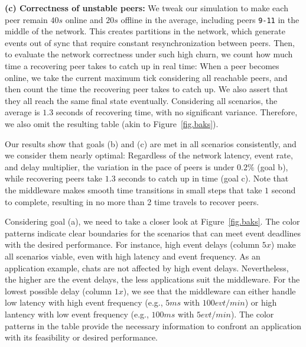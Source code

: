 \documentclass[fleqn,10pt]{SelfArx}
\newcommand{\code}[1]  {\texttt{\footnotesize{#1}}}
\begin{document}
\textbf{(c) Correctness of unstable peers:}
We tweak our simulation to make each peer remain $40s$ online and $20s$
offline in the average, including peers \code{9-11} in the middle of the
network.
This creates partitions in the network, which generate events out of sync that
require constant resynchronization between peers.
%
Then, to evaluate the network correctness under such high churn, we count how
much time a recovering peer takes to catch up in real time:
When a peer becomes online, we take the current maximum tick considering all
reachable peers, and then count the time the recovering peer takes to catch up.
We also assert that they all reach the same final state eventually.
%
Considering all scenarios, the average is $1.3$ seconds of recovering time,
with no significant variance.
Therefore, we also omit the resulting table (akin to Figure~\ref{fig.baks}).

Our results show that goals (b) and (c) are met in all scenarios consistently,
and we consider them nearly optimal:
Regardless of the network latency, event rate, and delay multiplier,
    the variation in the pace of peers is under $0.2\%$ (goal b), while
    recovering peers take $1.3$ seconds to catch up in time (goal c).
Note that the middleware makes smooth time transitions in small steps that take
$1$ second to complete, resulting in no more than 2 time travels to recover
peers.

Considering goal (a), we need to take a closer look at Figure~\ref{fig.baks}.
The color patterns indicate clear boundaries for the scenarios that can meet
event deadlines with the desired performance.
%
For instance, high event delays (column $5x$) make all scenarios viable,
even with high latency and event frequency.
As an application example, chats are not affected by high event delays.
Nevertheless, the higher are the event delays, the less applications suit the
middleware.
%
For the lowest possible delay (column $1x$), we see that the middleware can
either handle low latency with high event frequency (e.g., $5ms$ with
$100evt/min$) or high lantency with low event frequency (e.g., $100ms$ with
$5evt/min$).
%
The color patterns in the table provide the necessary information to confront
an application with its feasibility or desired performance.
\end{document}
